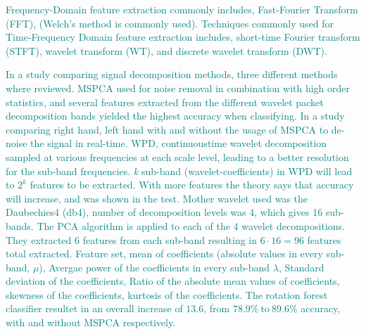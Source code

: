 \textcolor{teal}{
	Frequency-Domain feature extraction commonly includes, Fast-Fourier Transform (FFT), (Welch's method is commonly used)\cite{padfieldEEGBasedBrainComputerInterfaces2019}.
}
\textcolor{teal}{
	Techniques commonly used for Time-Frequency Domain feature extraction includes, short-time Fourier transform (STFT), wavelet transform (WT), and discrete wavelet transform (DWT)\cite{padfieldEEGBasedBrainComputerInterfaces2019}.
}

\textcolor{teal}{
	In a study comparing signal decomposition methods, three different methods where reviewed. MSPCA used for noise removal in combination with  high order statistics, and several features extracted from the different wavelet packet decomposition bands yielded the highest accuracy when classifying\cite{kevricComparisonSignalDecomposition2017}.
}
%
\textcolor{teal}{In a study comparing right hand, left hand with and without the usage of MSPCA to de-noise the signal in real-time. WPD, continuoustime wavelet decomposition sampled at various frequencies at each scale level, leading to a better resolution for the sub-band frequencies. \textit{k} sub-band (wavelet-coefficients) in WPD will lead to $2^k$ features to be extracted. With more features the theory says that accuracy will increase, and was shown in the test\cite{kevric2015impact}. Mother wavelet used was the Daubechies4 (db4), number of decomposition levels was 4, which gives 16 sub-bands.
}
%
\textcolor{teal}{
	The PCA algorithm is applied to each of the 4 wavelet decompositions. They extracted 6 features from each sub-band resulting in $6\cdot 16 = 96$ features total extracted. Feature set, mean of coefficients (absolute values in every sub-band, $\mu$), Avergae power of the coefficients in every sub-band $\lambda$, Standard deviation of the coefficients, Ratio of the absolute mean values of coefficients, skewness of the coefficients, kurtosis of the coefficients. The rotation forest classifier resultet in an overall increase of $13.6$, from $78.9\% \: \text{to} \: 89.6\% $ accuracy, with and without MSPCA respectively\cite{kevric2015impact}.}
%
